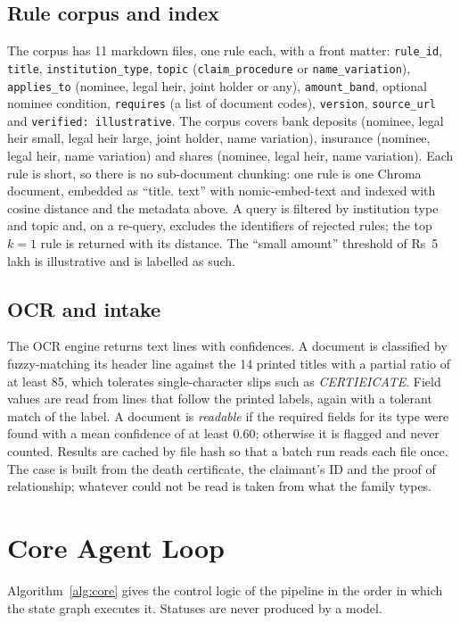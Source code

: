 \documentclass[12pt,a4paper,oneside]{report}
\begin{document}
\subsection{Rule corpus and index}
The corpus has 11 markdown files, one rule each, with a front matter: \texttt{rule\_id}, \texttt{title}, \texttt{institution\_type}, \texttt{topic} (\texttt{claim\_procedure} or \texttt{name\_variation}), \texttt{applies\_to} (nominee, legal heir, joint holder or any), \texttt{amount\_band}, optional nominee condition, \texttt{requires} (a list of document codes), \texttt{version}, \texttt{source\_url} and \texttt{verified: illustrative}. The corpus covers bank deposits (nominee, legal heir small, legal heir large, joint holder, name variation), insurance (nominee, legal heir, name variation) and shares (nominee, legal heir, name variation). Each rule is short, so there is no sub-document chunking: one rule is one Chroma document, embedded as ``title. text'' with nomic-embed-text and indexed with cosine distance and the metadata above. A query is filtered by institution type and topic and, on a re-query, excludes the identifiers of rejected rules; the top $k=1$ rule is returned with its distance. The ``small amount'' threshold of Rs~5 lakh is illustrative and is labelled as such.

\subsection{OCR and intake}
The OCR engine returns text lines with confidences. A document is classified by fuzzy-matching its header line against the 14 printed titles with a partial ratio of at least 85, which tolerates single-character slips such as \emph{CERTIEICATE}. Field values are read from lines that follow the printed labels, again with a tolerant match of the label. A document is \emph{readable} if the required fields for its type were found with a mean confidence of at least 0.60; otherwise it is flagged and never counted. Results are cached by file hash so that a batch run reads each file once. The case is built from the death certificate, the claimant's ID and the proof of relationship; whatever could not be read is taken from what the family types.

\section{Core Agent Loop}
Algorithm~\ref{alg:core} gives the control logic of the pipeline in the order in which the state graph executes it. Statuses are never produced by a model.
\end{document}
